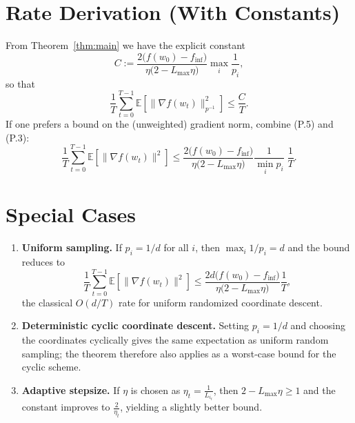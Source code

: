 \documentclass{article}
\newcommand{\EE}{\mathbb{E}}
\begin{document}
\section*{Rate Derivation (With Constants)}
From Theorem~\ref{thm:main} we have the explicit constant
\[
C:=\frac{2\bigl(f(w_0)-f_{\inf}\bigr)}{\eta\bigl(2-L_{\max}\eta\bigr)}
\max_{i}\frac{1}{p_i},
\]
so that
\[
\frac{1}{T}\sum_{t=0}^{T-1}\EE\!\left[\|\nabla f(w_t)\|_{p^{-1}}^{2}\right]\le \frac{C}{T}.
\]
If one prefers a bound on the (unweighted) gradient norm, combine (P.5) and (P.3):
\[
\frac{1}{T}\sum_{t=0}^{T-1}\EE\!\left[\|\nabla f(w_t)\|^{2}\right]
\le
\frac{2\bigl(f(w_0)-f_{\inf}\bigr)}{\eta\bigl(2-L_{\max}\eta\bigr)}
\frac{1}{\min_i p_i}\;\frac{1}{T}.
\]

\section*{Special Cases}
\begin{enumerate}[leftmargin=*]
\item \textbf{Uniform sampling.}
If $p_i=1/d$ for all $i$, then $\max_i 1/p_i=d$ and the bound reduces to
\[
\frac{1}{T}\sum_{t=0}^{T-1}\EE\!\left[\|\nabla f(w_t)\|^{2}\right]
\le \frac{2d\bigl(f(w_0)-f_{\inf}\bigr)}{\eta\bigl(2-L_{\max}\eta\bigr)}\frac{1}{T},
\]
the classical $O(d/T)$ rate for uniform randomized coordinate descent.

\item \textbf{Deterministic cyclic coordinate descent.}
Setting $p_i=1/d$ and choosing the coordinates cyclically gives the same
expectation as uniform random sampling; the theorem therefore also applies as a
worst‑case bound for the cyclic scheme.

\item \textbf{Adaptive stepsize.}
If $\eta$ is chosen as $\eta_t=\frac{1}{L_{i_t}}$, then $2-L_{\max}\eta\ge1$ and the
constant improves to $\frac{2}{\eta_t}$, yielding a slightly better bound.
\end{enumerate}
\end{document}

